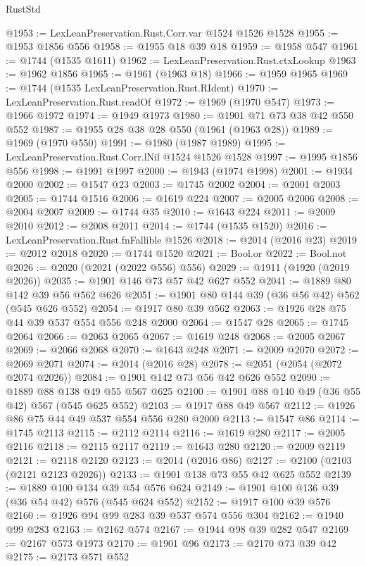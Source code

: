\begin{lexlean}{RustStd}
\begin{coremodule}
@1953 := LexLeanPreservation.Rust.Corr.var @1524 @1526 @1528
@1955 := @1953 @1856 @556
@1958 := @1955 @18 @39 @18
@1959 := @1958 @547
@1961 := @1744 (@1535 @1611)
@1962 := LexLeanPreservation.Rust.ctxLookup
@1963 := @1962 @1856
@1965 := @1961 (@1963 @18)
@1966 := @1959 @1965
@1969 := @1744 (@1535 LexLeanPreservation.Rust.RIdent)
@1970 := LexLeanPreservation.Rust.readOf
@1972 := @1969 (@1970 @547)
@1973 := @1966 @1972
@1974 := @1949 @1973
@1980 := @1901 @71 @73 @38 @42 @550 @552
@1987 := @1955 @28 @38 @28 @550 (@1961 (@1963 @28))
@1989 := @1969 (@1970 @550)
@1991 := @1980 (@1987 @1989)
@1995 := LexLeanPreservation.Rust.Corr.lNil @1524 @1526 @1528
@1997 := @1995 @1856 @556
@1998 := @1991 @1997
@2000 := @1943 (@1974 @1998)
@2001 := @1934 @2000
@2002 := @1547 @23
@2003 := @1745 @2002
@2004 := @2001 @2003
@2005 := @1744 @1516
@2006 := @1619 @224
@2007 := @2005 @2006
@2008 := @2004 @2007
@2009 := @1744 @35
@2010 := @1643 @224
@2011 := @2009 @2010
@2012 := @2008 @2011
@2014 := @1744 (@1535 @1520)
@2016 := LexLeanPreservation.Rust.fnFallible @1526
@2018 := @2014 (@2016 @23)
@2019 := @2012 @2018
@2020 := @1744 @1520
@2021 := Bool.or
@2022 := Bool.not
@2026 := @2020 (@2021 (@2022 @556) @556)
@2029 := @1911 (@1920 (@2019 @2026))
@2035 := @1901 @146 @73 @57 @42 @627 @552
@2041 := @1889 @80 @142 @39 @56 @562 @626
@2051 := @1901 @80 @144 @39 (@36 @56 @42) @562 (@545 @626 @552)
@2054 := @1917 @80 @39 @562
@2063 := @1926 @28 @75 @44 @39 @537 @554 @556 @248 @2000
@2064 := @1547 @28
@2065 := @1745 @2064
@2066 := @2063 @2065
@2067 := @1619 @248
@2068 := @2005 @2067
@2069 := @2066 @2068
@2070 := @1643 @248
@2071 := @2009 @2070
@2072 := @2069 @2071
@2074 := @2014 (@2016 @28)
@2078 := @2051 (@2054 (@2072 @2074 @2026))
@2084 := @1901 @142 @73 @56 @42 @626 @552
@2090 := @1889 @88 @138 @49 @55 @567 @625
@2100 := @1901 @88 @140 @49 (@36 @55 @42) @567 (@545 @625 @552)
@2103 := @1917 @88 @49 @567
@2112 := @1926 @86 @75 @44 @49 @537 @554 @556 @280 @2000
@2113 := @1547 @86
@2114 := @1745 @2113
@2115 := @2112 @2114
@2116 := @1619 @280
@2117 := @2005 @2116
@2118 := @2115 @2117
@2119 := @1643 @280
@2120 := @2009 @2119
@2121 := @2118 @2120
@2123 := @2014 (@2016 @86)
@2127 := @2100 (@2103 (@2121 @2123 @2026))
@2133 := @1901 @138 @73 @55 @42 @625 @552
@2139 := @1889 @100 @134 @39 @54 @576 @624
@2149 := @1901 @100 @136 @39 (@36 @54 @42) @576 (@545 @624 @552)
@2152 := @1917 @100 @39 @576
@2160 := @1926 @94 @99 @283 @39 @537 @574 @556 @304
@2162 := @1940 @99 @283
@2163 := @2162 @574
@2167 := @1944 @98 @39 @282 @547
@2169 := @2167 @573 @1973
@2170 := @1901 @96
@2173 := @2170 @73 @39 @42
@2175 := @2173 @571 @552

\end{coremodule}
\end{lexlean}

